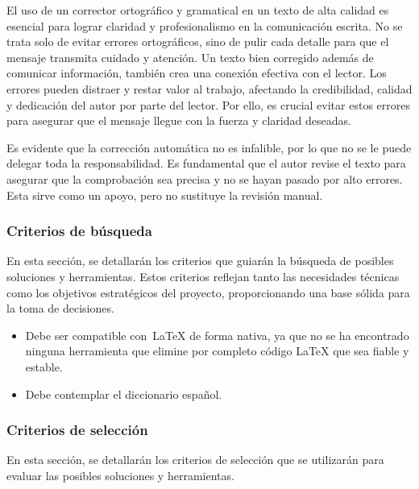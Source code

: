 El uso de un corrector ortográfico y gramatical en un texto de alta calidad es esencial para lograr claridad y profesionalismo en la comunicación escrita. No se trata solo de evitar errores ortográficos, sino de pulir cada detalle para que el mensaje transmita cuidado y atención. Un texto bien corregido además de comunicar información, también crea una conexión efectiva con el lector. Los errores pueden distraer y restar valor al trabajo, afectando la credibilidad, calidad y dedicación del autor por parte del lector. Por ello, es crucial evitar estos errores para asegurar que el mensaje llegue con la fuerza y claridad deseadas.

Es evidente que la corrección automática no es infalible, por lo que no se le puede delegar toda la responsabilidad. Es fundamental que el autor revise el texto para asegurar que la comprobación sea precisa y no se hayan pasado por alto errores. Esta sirve como un apoyo, pero no sustituye la revisión manual.

\subsubsection{Criterios de búsqueda}

En esta sección, se detallarán los criterios que guiarán la búsqueda de posibles soluciones y herramientas. Estos criterios reflejan tanto las necesidades técnicas como los objetivos estratégicos del proyecto, proporcionando una base sólida para la toma de decisiones. 

\begin{itemize}
    \item Debe ser compatible con~\LaTeX{} de forma nativa, ya que no se ha encontrado ninguna herramienta que elimine por completo código \LaTeX{} que sea fiable y estable.
    \item Debe contemplar el diccionario español.
\end{itemize}

\subsubsection{Criterios de selección}

En esta sección, se detallarán los criterios de selección que se utilizarán para evaluar las posibles soluciones y herramientas.

